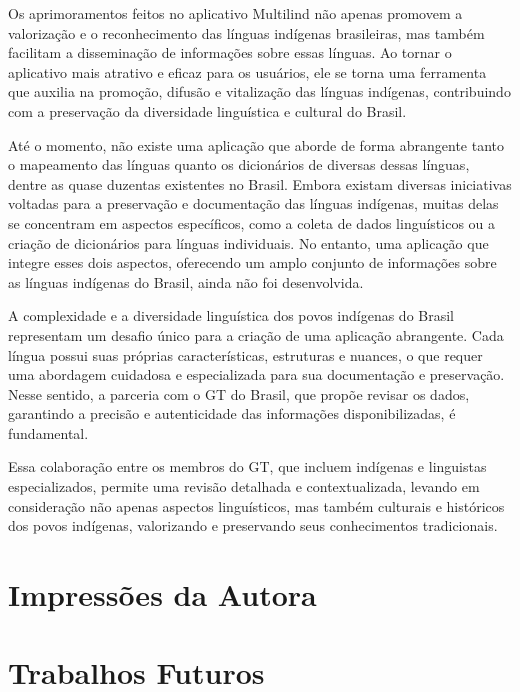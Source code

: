 Os aprimoramentos feitos no aplicativo Multilind não apenas promovem a valorização e o reconhecimento das línguas indígenas brasileiras, mas também facilitam a disseminação de informações sobre 
essas línguas. Ao tornar o aplicativo mais atrativo e eficaz para os usuários, ele se torna uma ferramenta que auxilia na promoção, difusão e vitalização das línguas indígenas, contribuindo com 
a preservação da diversidade linguística e cultural do Brasil.

Até o momento, não existe uma aplicação que aborde de forma abrangente tanto o mapeamento das línguas quanto os dicionários de diversas dessas línguas, dentre as quase duzentas existentes no Brasil. Embora 
existam diversas iniciativas voltadas para a preservação e documentação das línguas indígenas, muitas delas se concentram em aspectos específicos, como a coleta de dados linguísticos ou a criação de 
dicionários para línguas individuais. No entanto, uma aplicação que integre esses dois aspectos, oferecendo um amplo conjunto de informações sobre as línguas indígenas do Brasil, ainda não foi desenvolvida.

A complexidade e a diversidade linguística dos povos indígenas do Brasil representam um desafio único para a criação de uma aplicação abrangente. Cada língua possui suas próprias características, estruturas 
e nuances, o que requer uma abordagem cuidadosa e especializada para sua documentação e preservação. Nesse sentido, a parceria com o GT do Brasil, que propõe revisar os dados, garantindo a precisão e autenticidade 
das informações disponibilizadas, é fundamental. 

Essa colaboração entre os membros do GT, que incluem indígenas e linguistas especializados, permite uma revisão detalhada e contextualizada, levando em consideração não apenas aspectos linguísticos, mas também 
culturais e históricos dos povos indígenas, valorizando e preservando seus conhecimentos tradicionais.

\section{Impressões da Autora}
\label{sec:Impressões da Autora}



\section{Trabalhos Futuros}
\label{sec:Trabalhos Futuros}
